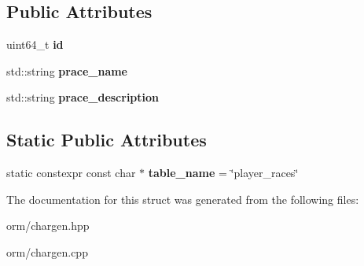 \subsection*{Public Attributes}
\begin{DoxyCompactItemize}
\item 
\mbox{\label{structmods_1_1orm_1_1player__races_af8adb4d232aed38b91a72bf499909404}} 
uint64\+\_\+t {\bfseries id}
\item 
\mbox{\label{structmods_1_1orm_1_1player__races_aea50345ec921e7bb04c44921dfb0f85e}} 
std\+::string {\bfseries prace\+\_\+name}
\item 
\mbox{\label{structmods_1_1orm_1_1player__races_a5e205d8f29a363dc62514ba54826651e}} 
std\+::string {\bfseries prace\+\_\+description}
\end{DoxyCompactItemize}
\subsection*{Static Public Attributes}
\begin{DoxyCompactItemize}
\item 
\mbox{\label{structmods_1_1orm_1_1player__races_af6deb3064d5a695e0d48e4daf2500aa8}} 
static constexpr const char $\ast$ {\bfseries table\+\_\+name} = \char`\"{}player\+\_\+races\char`\"{}
\end{DoxyCompactItemize}


The documentation for this struct was generated from the following files\+:\begin{DoxyCompactItemize}
\item 
orm/chargen.\+hpp\item 
orm/chargen.\+cpp\end{DoxyCompactItemize}
